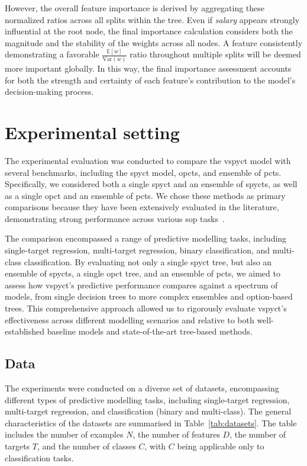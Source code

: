 \documentclass[3p,review,authoryear]{elsarticle}
\begin{document}
However, the overall feature importance is derived by aggregating these normalized ratios across all splits within the tree.
Even if \textit{salary} appears strongly influential at the root node, the final importance calculation considers both the magnitude and the stability of the weights across all nodes.
A feature consistently demonstrating a favorable \(\frac{\mathbb{E}[w]}{\text{Var}(w)}\) ratio throughout multiple splits will be deemed more important globally.
In this way, the final importance assessment accounts for both the strength and certainty of each feature’s contribution to the model’s decision-making process.


\section{Experimental setting}

The experimental evaluation was conducted to compare the \gls{vspyct} model with several benchmarks, including the \gls{spyct} model, \glspl{opct}, and ensemble of \glspl{pct}.
Specifically, we considered both a single \gls{spyct} and an ensemble of \glspl{spyct}, as well as a single \gls{opct} and an ensemble of \glspl{pct}.
We chose these methods as primary comparisons because they have been extensively evaluated in the literature, demonstrating strong performance across various \gls{sop} tasks~\citep{Andonovikj_2024}.

The comparison encompassed a range of predictive modelling tasks, including single-target regression, multi-target regression, binary classification, and multi-class classification.
By evaluating not only a single \gls{spyct} tree, but also an ensemble of \glspl{spyct}, a single \gls{opct} tree, and an ensemble of \glspl{pct}, we aimed to assess how \gls{vspyct}'s predictive performance compares against a spectrum of models, from single decision trees to more complex ensembles and option-based trees.
This comprehensive approach allowed us to rigorously evaluate \gls{vspyct}'s effectiveness across different modelling scenarios and relative to both well-established baseline models and state-of-the-art tree-based methods.


\subsection{Data}

The experiments were conducted on a diverse set of datasets, encompassing different types of predictive modelling tasks, including single-target regression, multi-target regression, and classification (binary and multi-class).
The general characteristics of the datasets are summarised in Table~\ref{tab:datasets}.
The table includes the number of examples \(N\), the number of features \(D\), the number of targets \(T\), and the number of classes \(C\), with \(C\) being applicable only to classification tasks.
\end{document}
